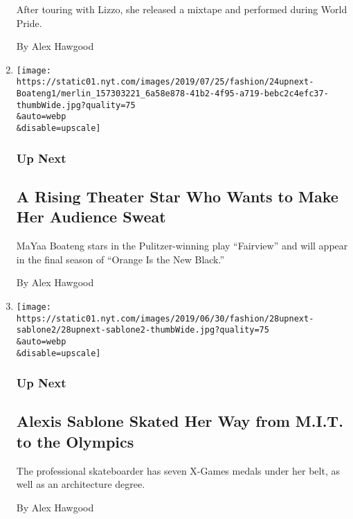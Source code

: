 \begin{enumerate}
  After touring with Lizzo, she released a mixtape and performed during
  World Pride.

  By Alex Hawgood
\item
  \href{/2019/07/24/style/mayaa-boateng-fairview-orange-new-black.html}{}

  \texttt{[image: https://static01.nyt.com/images/2019/07/25/fashion/24upnext-Boateng1/merlin\_157303221\_6a58e878-41b2-4f95-a719-bebc2c4efc37-thumbWide.jpg?quality=75\\\&auto=webp\\\&disable=upscale]}

  \hypertarget{up-next-3}{%
  \subsubsection{Up Next}\label{up-next-3}}

  \hypertarget{a-rising-theater-star-who-wants-to-make-her-audience-sweat}{%
  \subsection{A Rising Theater Star Who Wants to Make Her Audience
  Sweat}\label{a-rising-theater-star-who-wants-to-make-her-audience-sweat}}

  MaYaa Boateng stars in the Pulitzer-winning play ``Fairview'' and will
  appear in the final season of ``Orange Is the New Black.''

  By Alex Hawgood
\item
  \href{/2019/06/28/style/alexis-sablone-mit-grad-and-future-olympic-skateboarder.html}{}

  \texttt{[image: https://static01.nyt.com/images/2019/06/30/fashion/28upnext-sablone2/28upnext-sablone2-thumbWide.jpg?quality=75\\\&auto=webp\\\&disable=upscale]}

  \hypertarget{up-next-4}{%
  \subsubsection{Up Next}\label{up-next-4}}

  \hypertarget{alexis-sablone-skated-her-way-from-mit-to-the-olympics}{%
  \subsection{Alexis Sablone Skated Her Way from M.I.T. to the
  Olympics}\label{alexis-sablone-skated-her-way-from-mit-to-the-olympics}}

  The professional skateboarder has seven X-Games medals under her belt,
  as well as an architecture degree.

  By Alex Hawgood
\end{enumerate}

